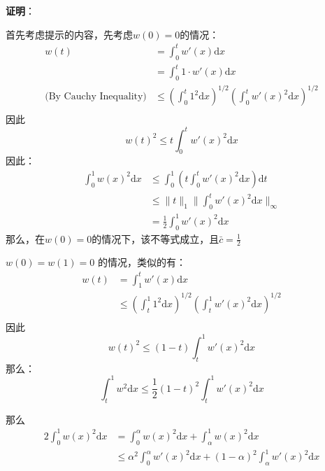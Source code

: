 \documentclass[11pt]{ctexart}
\begin{document}
\begin{flushleft}
\textbf{证明}：
\end{flushleft}

首先考虑提示的内容，先考虑$w(0) =0$的情况：
\begin{equation}
  \begin{aligned}
    w(t) &=\int_0^t w'(x)\mathrm dx \\
    &= \int_0^t 1 \cdot w'(x)\mathrm dx \\
    \text{(By Cauchy Inequality)}&\le \left( \int_0^t 1^2 \mathrm dx \right)^{1/2}
    \left( \int_0^t w'(x)^2 \mathrm d x\right)^{1/2}\\
  \end{aligned}
\end{equation}
因此
\begin{equation}
  w(t)^2 \le t \int_0^t w'(x)^2\mathrm dx
\end{equation}
因此：
\begin{equation}
  \begin{aligned}
    \int_0^1 w(x)^2 \mathrm dx &\le \int_0^1 \left(t \int_0^t w'(x)^2\mathrm dx\right) \mathrm dt\\
    &\le \| t \|_1 \| \int_0^t w'(x)^2\mathrm dx\|_\infty\\
    &= \frac{1}{2} \int_0^1 w'(x)^2\mathrm dx
  \end{aligned}
\end{equation}
那么，在$w(0) = 0$的情况下，该不等式成立，且$\bar c = \frac{1}{2}$

$w(0) = w(1) = 0$ 的情况，类似的有：
\begin{equation}
  \begin{aligned}
    w(t) &=  \int_1^t w'(x)\mathrm dx \\
    &\le \left( \int_t^1 1^2 \mathrm dx \right)^{1/2}
    \left( \int_t^1 w'(x)^2 \mathrm d x\right)^{1/2}\\
  \end{aligned}
\end{equation}
因此
\begin{equation}
  w(t)^2 \le (1-t) \int_t^1 w'(x)^2\mathrm dx
\end{equation}
那么：
\begin{equation}
  \int_t^1 w^2 \mathrm dx\le \frac{1}{2}(1-t)^2 \int_t^1 w'(x)^2 \mathrm dx
\end{equation}

那么
\begin{equation}
  \begin{aligned}
    2\int_0^1 w(x)^2 \mathrm dx& = 
            \int_0^{\alpha} w(x)^2 \mathrm dx + 
            \int_{\alpha}^1 w(x)^2 \mathrm dx\\
    &\le 
        \alpha^2\int_0^{\alpha} w'(x)^2\mathrm dx 
        + (1-\alpha)^2\int_{\alpha}^{1} w'(x)^2\mathrm dx
  \end{aligned}
\end{equation}
\end{document}
